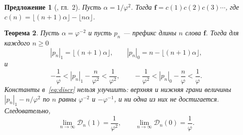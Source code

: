 \documentclass[a4paper,14pt]{extreport}
\theoremstyle{plain}
\newtheorem{theorem}{Теорема}[section]
\newtheorem{proposition}[theorem]{Предложение}
\theoremstyle{definition}
\theoremstyle{remark}
\begin{document}
\begin{proposition}[{\cite{Lothaire2002}, гл.~2}]\label{prop:mech}
	Пусть $\alpha=1/\varphi^{2}$. Тогда $\mathbf f=c(1)c(2)c(3)\cdots$, где
	$c(n)=\lfloor (n+1)\alpha\rfloor-\lfloor n\alpha\rfloor$.
\end{proposition}

\begin{theorem}\label{mainre}
	Пусть $\alpha=\varphi^{-2}$ и пусть $p_n$ --- префикс длины $n$ слова $\mathbf f$.
	Тогда для каждого $n\ge0$
	\begin{equation}\label{eq:exactcount}
		|p_n|_1=\lfloor (n+1)\alpha\rfloor,\qquad |p_n|_0=n-\lfloor (n+1)\alpha\rfloor,
	\end{equation}
	и
	\begin{equation}\label{eq:discr}
		-\frac1\varphi<|p_n|_1-\frac n{\varphi^{2}}<\frac1{\varphi^{2}},\qquad
		-\frac1{\varphi^{2}}<|p_n|_0-\frac n{\varphi}<\frac1{\varphi}.
	\end{equation}
	Константы в~\eqref{eq:discr} нельзя улучшить: верхняя и нижняя грани величины
	$|p_n|_1-n/\varphi^2$ по $n$ равны $\varphi^{-2}$ и $-\varphi^{-1}$, и ни одна из них не достигается.
	Следовательно,
	\begin{equation}
		\lim_{n\to\infty}\mathscr D_n(1)=\frac1{\varphi^{2}},\qquad
		\lim_{n\to\infty}\mathscr D_n(0)=\frac1{\varphi}.
	\end{equation}
\end{theorem}
\end{document}
